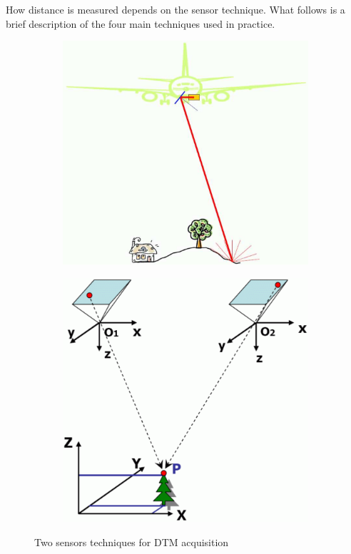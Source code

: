 How distance is measured depends on the sensor technique. 
What follows is a brief description of the four main techniques used in practice. 

\begin{figure}
	\centering
	\begin{subfigure}{0.4\linewidth}
		\includegraphics[width=\textwidth]{figs/lidar.png}
		\label{fig:acqLidar}
	\end{subfigure}
	\quad
	\begin{subfigure}{0.4\linewidth}
		\includegraphics[width=\textwidth]{figs/photogrammetry.png}
		\label{fig:acqPhoto}
	\end{subfigure}
	\caption{Two sensors techniques for DTM acquisition}
	\label{fig:sensors}
\end{figure}

